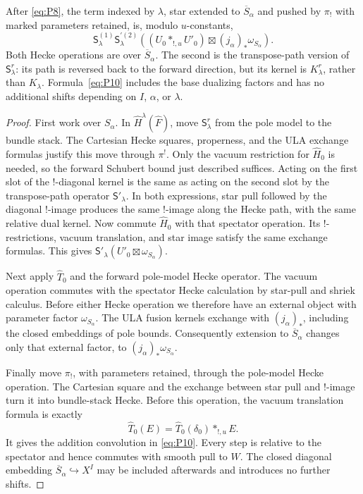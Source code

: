 \begin{lemma}
\label{planch:separation}
After \eqref{eq:P8}, the term indexed by $\lambda$, star extended to
$\overline S_\alpha$ and pushed by $\pi_!$ with marked parameters
retained, is, modulo $u$-constants,
\begin{equation}
 \mathsf S_\lambda^{(1)}\mathsf S_\lambda^{\prime(2)}
 \left((U_0*_{!,u}U'_0)\boxtimes
                    (j_\alpha)_*\omega_{S_\alpha}\right).
 \label{eq:P10}
\end{equation}
Both Hecke operations are over $\overline S_\alpha$.  The second is
the transpose-path version of $\mathsf S_\lambda^r$: its path is
reversed back to the forward direction, but its kernel is
$K_\lambda^r$, rather than $K_\lambda$.  Formula~\eqref{eq:P10}
includes the base dualizing factors and has no additional shifts
depending on $I$, $\alpha$, or $\lambda$.
\end{lemma}

\begin{proof}
First work over $S_\alpha$.  In
$\widehat H^\lambda(\widehat F)$, move
$\mathsf S_\lambda^r$ from the pole model to the bundle stack.
The Cartesian Hecke squares, properness, and the ULA exchange formulas
justify this move through $\pi^!$.  Only the vacuum restriction for
$\widehat H_0$ is needed, so the forward Schubert bound just described
suffices.  Acting on the first slot of the $!$-diagonal kernel is the
same as acting on the second slot by the transpose-path operator
$\mathsf S'_\lambda$.  In both expressions, star pull followed by
the diagonal $!$-image produces the same $!$-image along the Hecke
path, with the same relative dual kernel.  Now commute
$\widehat H_0$ with that spectator operation.  Its $!$-restrictions,
vacuum translation, and star image satisfy the same exchange
formulas.  This gives
$\mathsf S'_\lambda(U'_0\boxtimes\omega_{S_\alpha})$.

Next apply $\widehat T_0$ and the forward pole-model Hecke operator.
The vacuum operation commutes with the spectator Hecke calculation
by star-pull and shriek calculus.  Before either Hecke operation we
therefore have an external object with parameter factor
$\omega_{S_\alpha}$.  The ULA fusion kernels exchange with
$(j_\alpha)_*$, including the closed embeddings of pole bounds.
Consequently extension to $\overline S_\alpha$ changes only that
external factor, to $(j_\alpha)_*\omega_{S_\alpha}$.

Finally move $\pi_!$, with parameters retained, through the
pole-model Hecke operation.  The Cartesian square and the exchange
between star pull and $!$-image turn it into bundle-stack Hecke.
Before this operation, the vacuum translation formula is exactly
\[
 \widehat T_0(E)
   =\widehat T_0(\delta_0)*_{!,u}E.
\]
It gives the addition convolution in \eqref{eq:P10}.  Every step
is relative to the spectator and hence commutes with smooth pull to
$W$.  The closed diagonal embedding
$\overline S_\alpha\hookrightarrow X^I$ may be included afterwards
and introduces no further shifts.
\end{proof}

